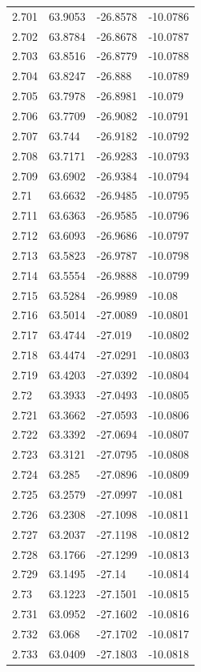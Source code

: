 \begin{tabular}{llll}
2.701 & 63.9053 & -26.8578 & -10.0786 \\
2.702 & 63.8784 & -26.8678 & -10.0787 \\
2.703 & 63.8516 & -26.8779 & -10.0788 \\
2.704 & 63.8247 & -26.888 & -10.0789 \\
2.705 & 63.7978 & -26.8981 & -10.079 \\
2.706 & 63.7709 & -26.9082 & -10.0791 \\
2.707 & 63.744 & -26.9182 & -10.0792 \\
2.708 & 63.7171 & -26.9283 & -10.0793 \\
2.709 & 63.6902 & -26.9384 & -10.0794 \\
2.71 & 63.6632 & -26.9485 & -10.0795 \\
2.711 & 63.6363 & -26.9585 & -10.0796 \\
2.712 & 63.6093 & -26.9686 & -10.0797 \\
2.713 & 63.5823 & -26.9787 & -10.0798 \\
2.714 & 63.5554 & -26.9888 & -10.0799 \\
2.715 & 63.5284 & -26.9989 & -10.08 \\
2.716 & 63.5014 & -27.0089 & -10.0801 \\
2.717 & 63.4744 & -27.019 & -10.0802 \\
2.718 & 63.4474 & -27.0291 & -10.0803 \\
2.719 & 63.4203 & -27.0392 & -10.0804 \\
2.72 & 63.3933 & -27.0493 & -10.0805 \\
2.721 & 63.3662 & -27.0593 & -10.0806 \\
2.722 & 63.3392 & -27.0694 & -10.0807 \\
2.723 & 63.3121 & -27.0795 & -10.0808 \\
2.724 & 63.285 & -27.0896 & -10.0809 \\
2.725 & 63.2579 & -27.0997 & -10.081 \\
2.726 & 63.2308 & -27.1098 & -10.0811 \\
2.727 & 63.2037 & -27.1198 & -10.0812 \\
2.728 & 63.1766 & -27.1299 & -10.0813 \\
2.729 & 63.1495 & -27.14 & -10.0814 \\
2.73 & 63.1223 & -27.1501 & -10.0815 \\
2.731 & 63.0952 & -27.1602 & -10.0816 \\
2.732 & 63.068 & -27.1702 & -10.0817 \\
2.733 & 63.0409 & -27.1803 & -10.0818 \\

\end{tabular}
